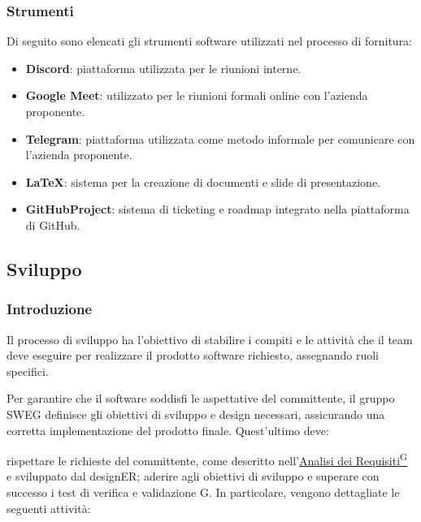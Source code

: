 \subsubsection{Strumenti}
Di seguito sono elencati gli strumenti software utilizzati nel processo di fornitura:
\begin{itemize}
    \item \textbf{Discord}: piattaforma utilizzata per le riunioni interne.
    \item \textbf{Google Meet}: utilizzato per le riunioni formali online con l'azienda proponente.
    \item \textbf{Telegram}: piattaforma utilizzata come metodo informale per comunicare con l'azienda proponente.
    \item \textbf{LaTeX}: sistema per la creazione di documenti e slide di presentazione.
    \item \textbf{GitHubProject}: sistema di ticketing e roadmap integrato nella piattaforma di GitHub. 
\end{itemize}









\subsection{Sviluppo}
\subsubsection{Introduzione}
Il processo di sviluppo ha l’obiettivo di stabilire i compiti e le attività che il team deve eseguire per realizzare il prodotto software richiesto, assegnando ruoli specifici.

Per garantire che il software soddisfi le aspettative del committente, il gruppo SWEG definisce gli obiettivi di sviluppo e design necessari, assicurando una corretta implementazione del prodotto finale. Quest’ultimo deve:

rispettare le richieste del committente, come descritto nell’\href{https://code7crusaders.github.io/docs/RTB/documentazione_interna/glossario.html#analisi-dei-requisiti}{Analisi dei Requisiti\textsuperscript{G}} e sviluppato dal designER;
aderire agli obiettivi di sviluppo e superare con successo i test di verifica e validazione G.
In particolare, vengono dettagliate le seguenti attività:
